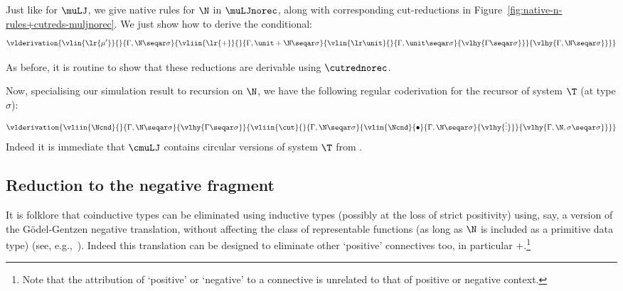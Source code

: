 \begin{example}
    Just like for $\muLJ$, we give native rules for $\N$ in $\muLJnorec$, along with corresponding cut-reductions in Figure~\ref{fig:native-n-rules+cutreds-muljnorec}. We just show how to derive the conditional:
 \[
\vlderivation
{
\vlin{\lr {\mu'}}{}{\Gamma, \N \seqar \sigma}
{
\vliin{\lr{+}}{}{\Gamma, \unit + \N \seqar \sigma}
{
\vlin{\lr \unit}{}{\Gamma, \unit \seqar \sigma}{\vlhy{\Gamma \seqar \sigma}}
}
{
\vlhy{\Gamma , \N \seqar \sigma }
}
}
}
\]
    
    As before, it is routine to show that these reductions are derivable using $\cutrednorec$.
    
Now, specialising our simulation result to recursion on $\N$, we have  the  following regular coderivation for the recursor of system $\T$ (at type $\sigma$):
    \[
           \vlderivation{
            \vliin{\Ncnd }{}{\Gamma, \N \seqar \sigma}
            {
            \vlhy{\Gamma \seqar \sigma}
            }{
            \vliin{\cut}{}{\Gamma, \N \seqar \sigma}
              {
              \vlin{\Ncnd}{\bullet}{\Gamma, \N \seqar \sigma}{\vlhy{\vdots}}
              }{
              \vlhy{\Gamma, \N,\sigma  \seqar \sigma}
              }
            } 
           }
    \]
Indeed it is immediate that $\cmuLJ$ contains circular versions of system $\T$ from \cite{Das21:CT-preprint,Das21:CT-fscd,KuperbergPP21systemT}.
\end{example}

\subsection{Reduction to the negative fragment}
\label{subsec:reduction-to-neg-frag}
It is folklore that coinductive types can be eliminated using inductive types (possibly at the loss of strict positivity) using, say, a version of the G\"odel-Gentzen negative translation, without affecting the class of representable functions (as long as $\N$ is included as a primitive data type) (see, e.g.,~\cite{avigad1998godel}).
Indeed this translation can be designed to eliminate other `positive' connectives too, in particular $+$.\footnote{Note that the attribution of `positive' or `negative' to a connective is unrelated to that of positive or negative context.}

